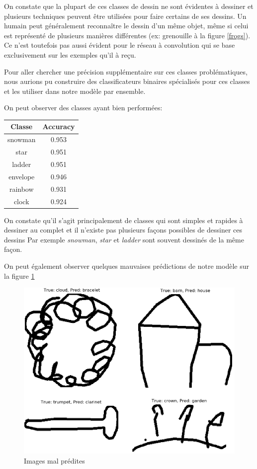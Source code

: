 On constate que la plupart de ces classes de dessin ne sont évidentes à dessiner et plusieurs techniques peuvent être utilisées pour faire certains de ses dessins. 
Un humain peut généralement reconnaître le dessin d'un même objet, même si celui est représenté de plusieurs manières différentes (ex: grenouille à la figure \ref{frogs}). 
Ce n'est toutefois pas aussi évident pour le réseau à convolution qui se base exclusivement sur les exemples qu'il à reçu.

Pour aller chercher une précision supplémentaire sur ces classes problématiques, nous aurions pu construire des classificateurs binaires spécialisés pour ces classes et les utiliser dans notre modèle par ensemble.

On peut observer des classes ayant bien performées: 

\begin{center}
\begin{tabular}{|c|c|}
\hline
\textbf{Classe} & \textbf{Accuracy} \\ \hline
snowman & 0.953 \\ \hline
star & 0.951 \\ \hline
ladder & 0.951 \\ \hline
envelope & 0.946 \\ \hline
rainbow & 0.931 \\ \hline
clock & 0.924 \\ \hline
\end{tabular}
\end{center}


On constate qu'il s'agit principalement de classes qui sont simples et rapides à dessiner au complet et il n'existe pas plusieurs façons possibles de dessiner ces dessins
Par exemple \emph{snowman}, \emph{star} et \emph{ladder} sont souvent dessinés de la même façon.


On peut également observer quelques mauvaises prédictions de notre modèle sur la figure \ref{comborate}

\begin{figure}[h]
	\includegraphics[width=\linewidth]{images/combo_rate.png} %
	\caption{Images mal prédites} %
	\label{comborate} 
\end{figure}

